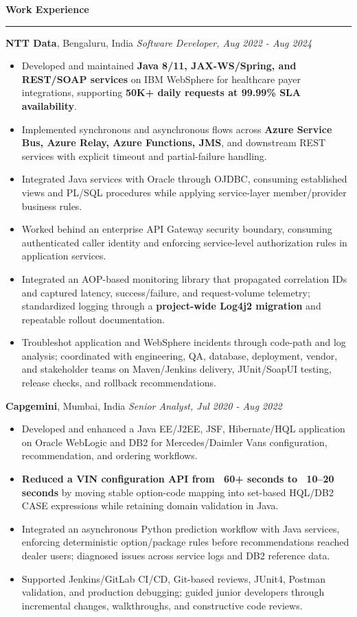\documentclass[11pt,letterpaper]{article}
\newcommand{\ressection}[1]{\Needspace{6\baselineskip}\vspace{8pt}\par\textbf{#1}\par\vspace{2pt}\hrule\vspace{5pt}}
\begin{document}
\ressection{Work Experience}
\textbf{NTT Data}, Bengaluru, India \hfill \textit{Software Developer, Aug 2022 - Aug 2024}
\begin{itemize}
  \item Developed and maintained \textbf{Java 8/11, JAX-WS/Spring, and REST/SOAP services} on IBM WebSphere for healthcare payer integrations, supporting \textbf{50K+ daily requests at 99.99\% SLA availability}.
  \item Implemented synchronous and asynchronous flows across \textbf{Azure Service Bus, Azure Relay, Azure Functions, JMS}, and downstream REST services with explicit timeout and partial-failure handling.
  \item Integrated Java services with Oracle through OJDBC, consuming established views and PL/SQL procedures while applying service-layer member/provider business rules.
  \item Worked behind an enterprise API Gateway security boundary, consuming authenticated caller identity and enforcing service-level authorization rules in application services.
  \item Integrated an AOP-based monitoring library that propagated correlation IDs and captured latency, success/failure, and request-volume telemetry; standardized logging through a \textbf{project-wide Log4j2 migration} and repeatable rollout documentation.
  \item Troubleshot application and WebSphere incidents through code-path and log analysis; coordinated with engineering, QA, database, deployment, vendor, and stakeholder teams on Maven/Jenkins delivery, JUnit/SoapUI testing, release checks, and rollback recommendations.
\end{itemize}
\textbf{Capgemini}, Mumbai, India \hfill \textit{Senior Analyst, Jul 2020 - Aug 2022}
\begin{itemize}
  \item Developed and enhanced a Java EE/J2EE, JSF, Hibernate/HQL application on Oracle WebLogic and DB2 for Mercedes/Daimler Vans configuration, recommendation, and ordering workflows.
  \item \textbf{Reduced a VIN configuration API from ~60+ seconds to ~10--20 seconds} by moving stable option-code mapping into set-based HQL/DB2 CASE expressions while retaining domain validation in Java.
  \item Integrated an asynchronous Python prediction workflow with Java services, enforcing deterministic option/package rules before recommendations reached dealer users; diagnosed issues across service logs and DB2 reference data.
  \item Supported Jenkins/GitLab CI/CD, Git-based reviews, JUnit4, Postman validation, and production debugging; guided junior developers through incremental changes, walkthroughs, and constructive code reviews.
\end{itemize}
\end{document}
